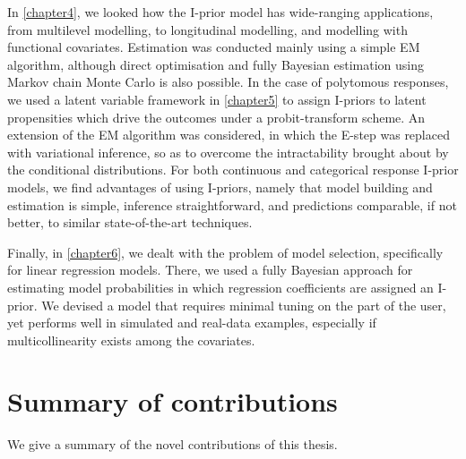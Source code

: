 \documentclass[showframe,11pt,twoside,openright]{report}
\begin{document}
In \cref{chapter4}, we looked how the I-prior model has wide-ranging applications, from multilevel modelling, to longitudinal modelling, and modelling with functional covariates.
Estimation was conducted mainly using a simple EM algorithm, although direct optimisation and fully Bayesian estimation using Markov chain Monte Carlo is also possible.
In the case of polytomous responses, we used a latent variable framework in \cref{chapter5} to assign I-priors to latent propensities which drive the outcomes under a probit-transform scheme. 
An extension of the EM algorithm was considered, in which the E-step was replaced with variational inference, so as to overcome the intractability brought about by the conditional distributions.
For both continuous and categorical response I-prior models, we find advantages of using I-priors, namely that model building and estimation is simple, inference  straightforward, and predictions comparable, if not better, to similar state-of-the-art techniques.

Finally, in \cref{chapter6}, we dealt with the problem of model selection, specifically for linear regression models.
There, we used a fully Bayesian approach for estimating model probabilities in which  regression coefficients are assigned an I-prior.
We devised a model that requires minimal tuning on the part of the user, yet performs well in simulated and real-data examples, especially if multicollinearity exists among the covariates.


\section{Summary of contributions}

We give a summary of the novel contributions of this thesis.
\end{document}
